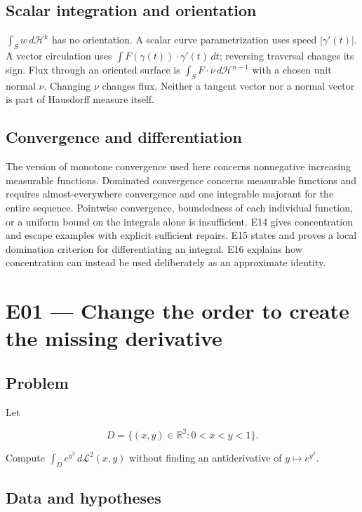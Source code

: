 \documentclass[
  11pt,
]{article}
\begin{document}
\subsection{Scalar integration and
orientation}\label{scalar-integration-and-orientation}

\(\int_S w\,d\mathcal H^k\) has no orientation. A scalar curve
parametrization uses speed \(|\gamma'(t)|\). A vector circulation uses
\(\int F(\gamma(t))\cdot\gamma'(t)\,dt\); reversing traversal changes
its sign. Flux through an oriented surface is
\(\int_S F\cdot\nu\,d\mathcal H^{n-1}\) with a chosen unit normal
\(\nu\). Changing \(\nu\) changes flux. Neither a tangent vector nor a
normal vector is part of Hausdorff measure itself.

\subsection{Convergence and
differentiation}\label{convergence-and-differentiation}

The version of monotone convergence used here concerns nonnegative
increasing measurable functions. Dominated convergence concerns
measurable functions and requires almost-everywhere convergence and one
integrable majorant for the entire sequence. Pointwise convergence,
boundedness of each individual function, or a uniform bound on the
integrals alone is insufficient. E14 gives concentration and escape
examples with explicit sufficient repairs. E15 states and proves a local
domination criterion for differentiating an integral. E16 explains how
concentration can instead be used deliberately as an approximate
identity.

\section{E01 --- Change the order to create the missing
derivative}\label{E01}

\subsection{Problem}\label{problem}

Let

\[
D=\{(x,y)\in\mathbb R^2:0<x<y<1\}.
\]

Compute \(\int_D e^{y^2}\,d\mathcal L^2(x,y)\) without finding an
antiderivative of \(y\mapsto e^{y^2}\).

\subsection{Data and hypotheses}\label{data-and-hypotheses}
\end{document}
